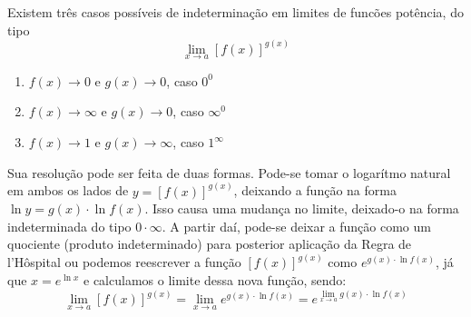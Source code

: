 Existem três casos possíveis de indeterminação em limites de funcões potência, do tipo $$\lim_{x \rightarrow a} [f(x)]^{g(x)}$$

\begin{enumerate}
	\item $f(x) \rightarrow 0$ e $g(x) \rightarrow 0$, caso $0^0$
	\item $f(x) \rightarrow \infty$ e $g(x) \rightarrow 0$, caso $\infty^0$
	\item $f(x) \rightarrow 1$ e $g(x) \rightarrow \infty$, caso $1^\infty$
\end{enumerate}

Sua resolução pode ser feita de duas formas. Pode-se tomar o logarítmo natural em ambos os lados de $y=[f(x)]^{g(x)}$, deixando a função na forma $\ln y = g(x) \cdot \ln f(x)$. Isso causa uma mudança no limite, deixado-o na forma indeterminada do tipo $0 \cdot \infty$. A partir daí, pode-se deixar a função como um quociente (produto indeterminado) para posterior aplicação da Regra de l'Hôspital ou podemos reescrever a função $[f(x)]^{g(x)}$ como $e^{g(x)\cdot \ln f(x)}$, já que $x=e^{\ln x}$ e calculamos o limite dessa nova função, sendo: $$\lim_{x \rightarrow a}[f(x)]^{g(x)} = \lim_{x \rightarrow a} e^{g(x) \cdot \ln f(x)} = e^{\lim_{x \rightarrow a} g(x) \cdot \ln f(x)}$$